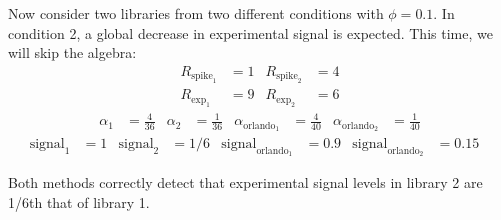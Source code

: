Now consider two libraries from two different conditions with $\phi=0.1$.
In condition 2, a global decrease in experimental signal is expected.
This time, we will skip the algebra:
\begin{align*}
    R_{\text{spike}_1} &= 1 & R_{\text{spike}_2} &= 4 \\
    R_{\text{exp}_1} &= 9 & R_{\text{exp}_2} &= 6
\end{align*}
\begin{align*}
    \alpha_1 &= \frac{4}{36} &
    \alpha_2 &= \frac{1}{36} &
    \alpha_{\text{orlando}_1} &= \frac{4}{40} &
    \alpha_{\text{orlando}_2} &= \frac{1}{40}
\end{align*}
\begin{align*}
    \text{signal}_1 &=  1 &
    \text{signal}_2 &=  1/6 &
    \text{signal}_{\text{orlando}_1} &= 0.9 &
    \text{signal}_{\text{orlando}_2} &= 0.15 &
\end{align*}

Both methods correctly detect that experimental signal levels in library 2 are 1/6th that of library 1.

